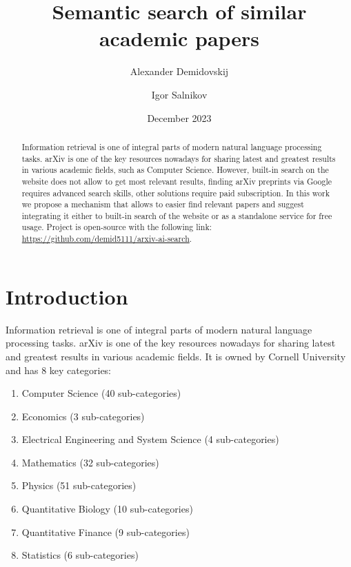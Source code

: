\documentclass{article}
\title{Semantic search of similar academic papers}
\author{Alexander Demidovskij \and Igor Salnikov}
\date{December 2023}
\begin{document}
\maketitle

\begin{abstract}
    Information retrieval is one of integral parts of modern natural language processing tasks. arXiv is one of the key resources nowadays for sharing latest and greatest results in various academic fields, such as Computer Science. However, built-in search on the website does not allow to get most relevant results, finding arXiv preprints via Google requires advanced search skills, other solutions require paid subscription. In this work we propose a mechanism that allows to easier find relevant papers and suggest integrating it either to built-in search of the website or as a standalone service for free usage. Project is open-source with the following link: \url{https://github.com/demid5111/arxiv-ai-search}.
\end{abstract}

\section{Introduction}
    Information retrieval is one of integral parts of modern natural language processing tasks. arXiv is one of the key resources nowadays for sharing latest and greatest results in various academic fields. It is owned by Cornell University and has 8 key categories:
    
    \begin{enumerate}
        \item Computer Science (40 sub-categories)
        \item Economics (3 sub-categories)
        \item Electrical Engineering and System Science (4 sub-categories)
        \item Mathematics (32 sub-categories)
        \item Physics (51 sub-categories)
        \item Quantitative Biology (10 sub-categories)
        \item Quantitative Finance (9 sub-categories)
        \item Statistics (6 sub-categories)
    \end{enumerate}
    
\end{document}
